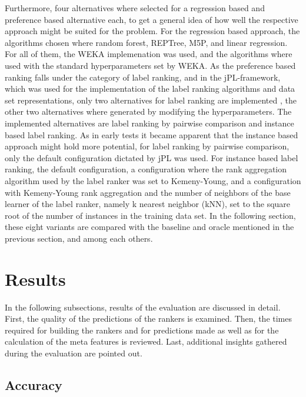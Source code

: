 Furthermore, four alternatives where selected for a regression based and preference based alternative each, to get a general idea of how well the respective approach might be suited for the problem. For the regression based approach, the algorithms chosen where random forest, REPTree, M5P, and linear regression. For all of them, the WEKA implemenation \cite{hall2009weka} was used, and the algorithms where used with the standard hyperparameters set by WEKA. As the preference based ranking falls under the category of label ranking, and in the jPL-framework, which was used for the implementation of the label ranking algorithms and data set representations, only two alternatives for label ranking are implemented \cite{intelligent2017jpl}, the other two alternatives where generated by modifying the hyperparameters. The implemented alternatives are label ranking by pairwise comparison and instance based label ranking. As in early tests it became apparent that the instance based approach might hold more potential, for label ranking by pairwise comparison, only the default configuration dictated by jPL was used. For instance based label ranking, the default configuration, a configuration where the rank aggregation algorithm used by the label ranker was set to Kemeny-Young, and a configuration with Kemeny-Young rank aggregation and the number of neighbors of the base learner of the label ranker, namely k nearest neighbor (kNN), set to the square root of the number of instances in the training data set. In the following section, these eight variants are compared with the baseline and oracle mentioned in the previous section, and among each others.

\section{Results}

In the following subsections, results of the evaluation are discussed in detail. First, the quality of the predictions of the rankers is examined. Then, the times required for building the rankers and for predictions made as well as for the calculation of the meta features is reviewed. Last, additional insights gathered during the evaluation are pointed out.

\subsection{Accuracy}

